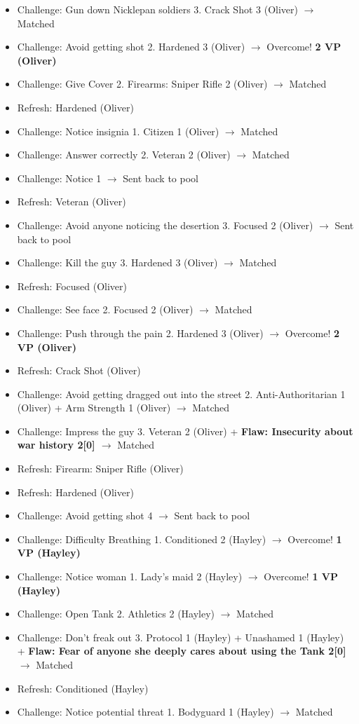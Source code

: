{\begin{itemize}
\item Challenge: Gun down Nicklepan soldiers 3.  Crack Shot 3 (Oliver) $\rightarrow$ Matched
\item Challenge: Avoid getting shot 2.  Hardened 3 (Oliver) $\rightarrow$ Overcome! \textbf{2 VP (Oliver)}
\item Challenge: Give Cover 2.  Firearms: Sniper Rifle 2 (Oliver) $\rightarrow$ Matched
\item Refresh: Hardened (Oliver)
\item Challenge: Notice insignia 1. Citizen 1 (Oliver)  $\rightarrow$ Matched
\item Challenge: Answer correctly 2. Veteran 2 (Oliver)  $\rightarrow$ Matched
\item Challenge: Notice 1 $\rightarrow$ Sent back to pool
\item Refresh: Veteran (Oliver)
\item Challenge: Avoid anyone noticing the desertion 3.  Focused 2 (Oliver) $\rightarrow$ Sent back to pool
\item Challenge: Kill the guy 3. Hardened 3 (Oliver) $\rightarrow$ Matched
\item Refresh: Focused (Oliver)
\item Challenge: See face 2.  Focused 2 (Oliver) $\rightarrow$ Matched
\item Challenge: Push through the pain 2.  Hardened 3 (Oliver) $\rightarrow$ Overcome! \textbf{2 VP (Oliver)}
\item Refresh: Crack Shot (Oliver)
\item Challenge: Avoid getting dragged out into the street 2. Anti-Authoritarian 1 (Oliver) + Arm Strength 1 (Oliver) $\rightarrow$ Matched
\item Challenge: Impress the guy 3. Veteran 2 (Oliver) + \textbf{ {\color[RGB]{255,0,0}Flaw: Insecurity about war history 2{[}0{]} } } $\rightarrow$ Matched
\item Refresh: Firearm: Sniper Rifle (Oliver)
\item Refresh: Hardened (Oliver)
\item Challenge: Avoid getting shot 4 $\rightarrow$ Sent back to pool
\item Challenge: Difficulty Breathing 1.  Conditioned 2 (Hayley) $\rightarrow$ Overcome! \textbf{1 VP (Hayley)}
\item Challenge: Notice woman 1.  Lady's maid 2 (Hayley) $\rightarrow$ Overcome! \textbf{1 VP (Hayley)}
\item Challenge: Open Tank 2.  Athletics 2 (Hayley) $\rightarrow$ Matched 
\item Challenge: Don't freak out 3.  Protocol 1 (Hayley) + Unashamed 1 (Hayley) + \textbf{ {\color[RGB]{255,0,0}Flaw: Fear of anyone she deeply cares about using the Tank 2{[}0{]}} } $\rightarrow$ Matched 
\item Refresh: Conditioned (Hayley)
\item Challenge: Notice potential threat 1.  Bodyguard 1 (Hayley) $\rightarrow$ Matched 
\end{itemize}

}
